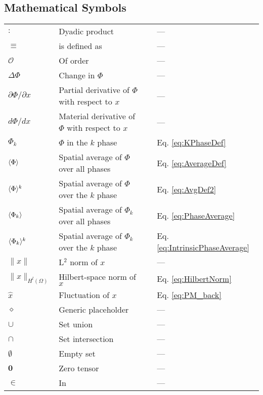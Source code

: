 \subsection*{Mathematical Symbols}
\begin{tabular}{p{2cm}p{9cm}p{2cm}p{5cm}}
\(\colon\) & Dyadic product &  \hspace{0.1cm}& ---\\
\(\equiv\) & is defined as &  & ---\\
\(\mathcal{O}\) & Of order &  & ---\\
\(\Delta\Phi\) & Change in $\Phi$ & & ---\\
\(\partial \Phi/\partial x\) & Partial derivative of \(\Phi\) with respect to \(x\) &  & ---\\
\(d\Phi/dx\) & Material derivative of \(\Phi\) with respect to \(x\) &  & ---\\
\(\Phi_k\) & \(\Phi\) in the \(k\) phase &  & Eq. \eqref{eq:KPhaseDef}\\
\(\langle \Phi\rangle\) & Spatial average of \(\Phi\) over all phases &  & Eq. \eqref{eq:AverageDef}\\
\(\langle \Phi\rangle^k\) & Spatial average of \(\Phi\) over the \(k\) phase &  & Eq. \eqref{eq:AvgDef2}\\
\(\langle\Phi_k\rangle\) & Spatial average of \(\Phi_k\) over all phases & & Eq. \eqref{eq:PhaseAverage}\\
\(\langle\Phi_k\rangle^k\) & Spatial average of \(\Phi_k\) over the \(k\) phase & & Eq. \eqref{eq:IntrinsicPhaseAverage}\\
\(\|x\|\) & L$^2$ norm of \(x\) & & ---\\
\(\|x\|_{H^l(\Omega)}\) & Hilbert-space norm of \(x\) & & Eq. \eqref{eq:HilbertNorm}\\
\(\hat{x}\) & Fluctuation of \(x\) & & Eq. \eqref{eq:PM_back}\\
\(\diamond\) & Generic placeholder & & ---\\
\(\cup\) & Set union & & ---\\
\(\cap\) & Set intersection & &--- \\
\(\emptyset\) & Empty set & & ---\\
\(\textbf{0}\) & Zero tensor & & ---\\
\(\in\) & In & & ---\\
\end{tabular}


